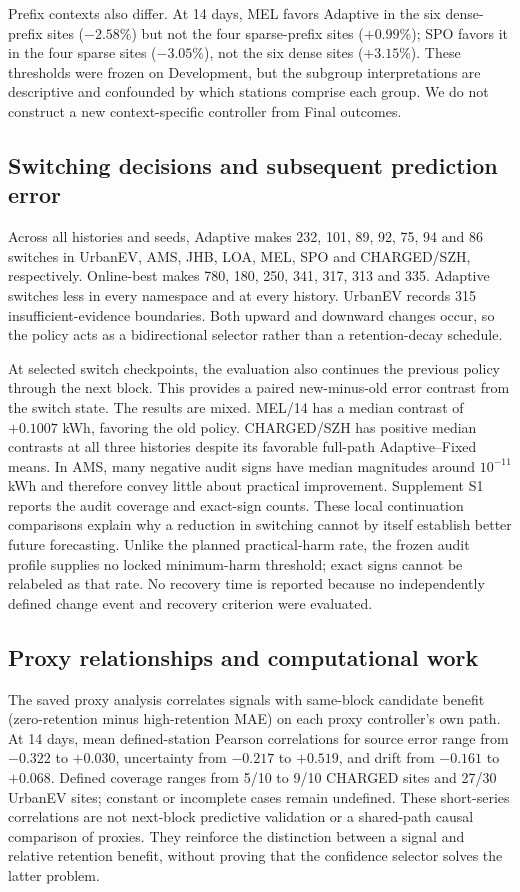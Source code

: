 \documentclass[pdflatex,iicol,sn-mathphys-num]{sn-jnl}
\begin{document}
Prefix contexts also differ. At 14 days, MEL favors Adaptive in the six dense-prefix sites ($-2.58\%$) but not the four sparse-prefix sites ($+0.99\%$); SPO favors it in the four sparse sites ($-3.05\%$), not the six dense sites ($+3.15\%$). These thresholds were frozen on Development, but the subgroup interpretations are descriptive and confounded by which stations comprise each group. We do not construct a new context-specific controller from Final outcomes.

\subsection{Switching decisions and subsequent prediction error}\label{sec:switch}
Across all histories and seeds, Adaptive makes 232, 101, 89, 92, 75, 94 and 86 switches in UrbanEV, AMS, JHB, LOA, MEL, SPO and CHARGED/SZH, respectively. Online-best makes 780, 180, 250, 341, 317, 313 and 335. Adaptive switches less in every namespace and at every history. UrbanEV records 315 insufficient-evidence boundaries. Both upward and downward changes occur, so the policy acts as a bidirectional selector rather than a retention-decay schedule.

At selected switch checkpoints, the evaluation also continues the previous policy through the next block. This provides a paired new-minus-old error contrast from the switch state. The results are mixed. MEL/14 has a median contrast of $+0.1007$ kWh, favoring the old policy. CHARGED/SZH has positive median contrasts at all three histories despite its favorable full-path Adaptive--Fixed means. In AMS, many negative audit signs have median magnitudes around $10^{-11}$ kWh and therefore convey little about practical improvement. Supplement S1 reports the audit coverage and exact-sign counts. These local continuation comparisons explain why a reduction in switching cannot by itself establish better future forecasting. Unlike the planned practical-harm rate, the frozen audit profile supplies no locked minimum-harm threshold; exact signs cannot be relabeled as that rate. No recovery time is reported because no independently defined change event and recovery criterion were evaluated.

\subsection{Proxy relationships and computational work}
The saved proxy analysis correlates signals with same-block candidate benefit (zero-retention minus high-retention MAE) on each proxy controller's own path. At 14 days, mean defined-station Pearson correlations for source error range from $-0.322$ to $+0.030$, uncertainty from $-0.217$ to $+0.519$, and drift from $-0.161$ to $+0.068$. Defined coverage ranges from 5/10 to 9/10 CHARGED sites and 27/30 UrbanEV sites; constant or incomplete cases remain undefined. These short-series correlations are not next-block predictive validation or a shared-path causal comparison of proxies. They reinforce the distinction between a signal and relative retention benefit, without proving that the confidence selector solves the latter problem.
\end{document}
